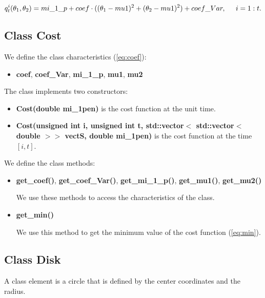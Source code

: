 \documentclass{report}
\begin{document}
		\begin{equation}
	q_t^i(\theta_1,\theta_2) = mi\_1\_p+ coef\cdot((\theta_1 - mu1)^2 + (\theta_2 -mu1)^2) + coef\_Var, \hspace*{5mm} i = 1:t.
	\label{eq:costcoef}
	\end{equation}
	
	\subsection*{Class  Cost}
	\label{Cost}
	
	We define the class characteristics (\ref{eq:coef}): 
	
	\begin{itemize}
		\item {\bfseries coef}, {\bfseries coef\_Var}, {\bfseries mi\_1\_p}, {\bfseries mu1}, {\bfseries mu2} 
	\end{itemize}
 
	The class implements two constructors:
	\begin{itemize}
		\item {\bfseries Cost(double mi\_1pen)} is the cost function at the unit time. 
		
		\item {\bfseries Cost(unsigned int i, unsigned int t, std::vector$<$ std::vector$<$ double $>>$ vectS, double mi\_1pen)} is the cost function at the time $[i,t]$. 
	\end{itemize}
	
	We define the class methods:
	
	\begin{itemize}
		\item {\bfseries get\_coef()}, {\bfseries get\_coef\_Var()}, {\bfseries get\_mi\_1\_p()}, {\bfseries get\_mu1()}, {\bfseries get\_mu2()}
		
		We use these  methods to access the characteristics of the class. 
		
		\item {\bfseries get\_min()}
		
		We use this method to get the minimum value of the cost function (\ref{eq:min}).
	\end{itemize} 

\newpage	

	\subsection*{Class Disk}
	\label{Disk}
	
	A class element is a circle that is defined by the center coordinates and the radius.
	
\end{document}

